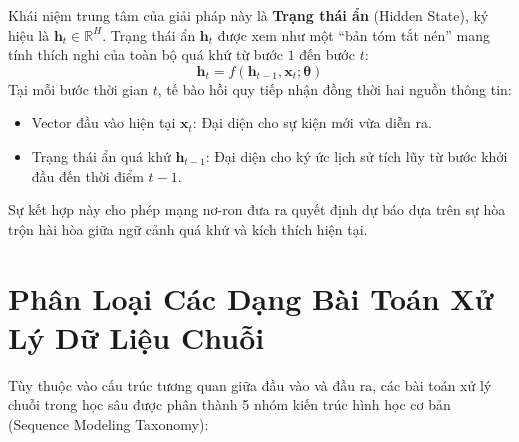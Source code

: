 \documentclass[12pt,a4paper]{report}
\begin{document}
Khái niệm trung tâm của giải pháp này là \textbf{Trạng thái ẩn} (Hidden State), ký hiệu là $\mathbf{h}_t \in \mathbb{R}^H$. Trạng thái ẩn $\mathbf{h}_t$ được xem như một “bản tóm tắt nén” mang tính thích nghi của toàn bộ quá khứ từ bước $1$ đến bước $t$:
\begin{equation}
    \mathbf{h}_t = f(\mathbf{h}_{t-1}, \mathbf{x}_t; \mathbf{\theta})
\end{equation}
Tại mỗi bước thời gian $t$, tế bào hồi quy tiếp nhận đồng thời hai nguồn thông tin:
\begin{itemize}
    \item Vector đầu vào hiện tại $\mathbf{x}_t$: Đại diện cho sự kiện mới vừa diễn ra.
    \item Trạng thái ẩn quá khứ $\mathbf{h}_{t-1}$: Đại diện cho ký ức lịch sử tích lũy từ bước khởi đầu đến thời điểm $t-1$.
\end{itemize}
Sự kết hợp này cho phép mạng nơ-ron đưa ra quyết định dự báo dựa trên sự hòa trộn hài hòa giữa ngữ cảnh quá khứ và kích thích hiện tại.

\section{Phân Loại Các Dạng Bài Toán Xử Lý Dữ Liệu Chuỗi}
Tùy thuộc vào cấu trúc tương quan giữa đầu vào và đầu ra, các bài toán xử lý chuỗi trong học sâu được phân thành 5 nhóm kiến trúc hình học cơ bản (Sequence Modeling Taxonomy):
\end{document}
